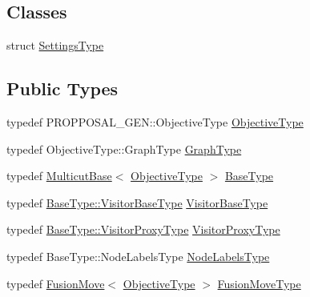 \subsection*{Classes}
\begin{DoxyCompactItemize}
\item 
struct \hyperlink{structnifty_1_1graph_1_1opt_1_1multicut_1_1FusionMoveBased_1_1SettingsType}{Settings\+Type}
\end{DoxyCompactItemize}
\subsection*{Public Types}
\begin{DoxyCompactItemize}
\item 
typedef P\+R\+O\+P\+P\+O\+S\+A\+L\+\_\+\+G\+E\+N\+::\+Objective\+Type \hyperlink{classnifty_1_1graph_1_1opt_1_1multicut_1_1FusionMoveBased_ac860a461dd2c12fd2e67553a4457ee58}{Objective\+Type}
\item 
typedef Objective\+Type\+::\+Graph\+Type \hyperlink{classnifty_1_1graph_1_1opt_1_1multicut_1_1FusionMoveBased_ab3e6f32ad6bad65f1ac4dba8697141b3}{Graph\+Type}
\item 
typedef \hyperlink{classnifty_1_1graph_1_1opt_1_1multicut_1_1MulticutBase}{Multicut\+Base}$<$ \hyperlink{classnifty_1_1graph_1_1opt_1_1multicut_1_1FusionMoveBased_ac860a461dd2c12fd2e67553a4457ee58}{Objective\+Type} $>$ \hyperlink{classnifty_1_1graph_1_1opt_1_1multicut_1_1FusionMoveBased_a53a90e2ae7b5ea7b2b301283011056bc}{Base\+Type}
\item 
typedef \hyperlink{classnifty_1_1graph_1_1opt_1_1common_1_1SolverBase_ad9932afb08dd17d375de4b15da9ffaa6}{Base\+Type\+::\+Visitor\+Base\+Type} \hyperlink{classnifty_1_1graph_1_1opt_1_1multicut_1_1FusionMoveBased_a943c3be60a36d1c9ae862919423633af}{Visitor\+Base\+Type}
\item 
typedef \hyperlink{classnifty_1_1graph_1_1opt_1_1common_1_1SolverBase_ad209b469b3bc9fc0fc14e9fed4d09075}{Base\+Type\+::\+Visitor\+Proxy\+Type} \hyperlink{classnifty_1_1graph_1_1opt_1_1multicut_1_1FusionMoveBased_a55c92ac6a0a3bf6e6e3111b5e4aa5e1a}{Visitor\+Proxy\+Type}
\item 
typedef Base\+Type\+::\+Node\+Labels\+Type \hyperlink{classnifty_1_1graph_1_1opt_1_1multicut_1_1FusionMoveBased_aba413de6d17c8728f09126c45e621cdd}{Node\+Labels\+Type}
\item 
typedef \hyperlink{classnifty_1_1graph_1_1opt_1_1multicut_1_1FusionMove}{Fusion\+Move}$<$ \hyperlink{classnifty_1_1graph_1_1opt_1_1multicut_1_1FusionMoveBased_ac860a461dd2c12fd2e67553a4457ee58}{Objective\+Type} $>$ \hyperlink{classnifty_1_1graph_1_1opt_1_1multicut_1_1FusionMoveBased_a95a0f97321c6dd76b0986d0a3a26a4cc}{Fusion\+Move\+Type}

\end{DoxyCompactItemize}
